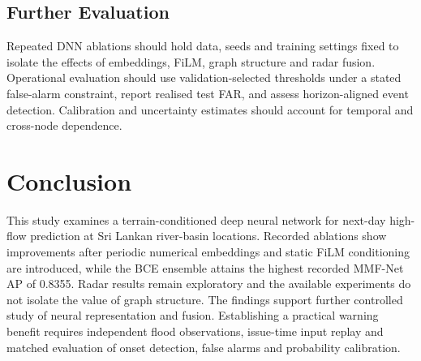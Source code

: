 \documentclass[conference]{IEEEtran}
\newcommand{\model}{MMF-Net}
\begin{document}
\subsection{Further Evaluation}
Repeated DNN ablations should hold data, seeds and
training settings fixed to isolate the effects of
embeddings, FiLM, graph structure and radar fusion.
Operational evaluation should use validation-selected
thresholds under a stated false-alarm constraint,
report realised test FAR, and assess horizon-aligned
event detection. Calibration and uncertainty estimates
should account for temporal and cross-node dependence.

\section{Conclusion}
This study examines a terrain-conditioned deep neural network for next-day
high-flow prediction at Sri Lankan river-basin locations. Recorded ablations
show improvements after periodic numerical embeddings and static FiLM
conditioning are introduced, while the BCE ensemble attains the highest
recorded \model{} AP of 0.8355. Radar results remain exploratory and the
available experiments do not isolate the value of graph structure. The findings
support further controlled study of neural representation and fusion.
Establishing a practical warning benefit requires independent flood observations,
issue-time input replay and matched evaluation of onset detection, false alarms
and probability calibration.
\end{document}
